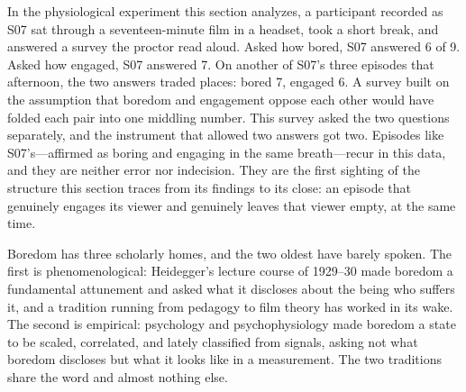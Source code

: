 
In the physiological experiment this section analyzes, a participant recorded as S07 sat
through a seventeen-minute film in a headset, took a short break, and answered a survey the
proctor read aloud. Asked how bored, S07 answered 6 of 9. Asked how engaged, S07 answered 7.
On another of S07's three episodes that afternoon, the two answers traded places: bored 7,
engaged 6. A survey built on the assumption that boredom and engagement oppose each other
would have folded each pair into one middling number. This survey asked the two questions
separately, and the instrument that allowed two answers got two. Episodes like
S07's---affirmed as boring and engaging in the same breath---recur in this data, and they are
neither error nor indecision. They are the first sighting of the structure this section
traces from its findings to its close: an episode that genuinely engages its viewer and
genuinely leaves that viewer empty, at the same time.

Boredom has three scholarly homes, and the two oldest have barely spoken. The first is
phenomenological: Heidegger's lecture course of 1929--30 made boredom a fundamental
attunement and asked what it discloses about the being who suffers it, and a tradition
running from pedagogy to film theory has worked in its wake. The second is empirical:
psychology and psychophysiology made boredom a state to be scaled, correlated, and lately
classified from signals, asking not what boredom discloses but what it looks like in a
measurement. The two traditions share the word and almost nothing else.

